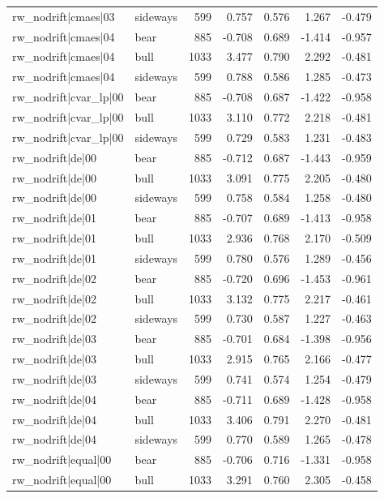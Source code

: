 \begin{table}
\begin{tabular}{llrrrrr}
rw\_nodrift|cmaes|03 & sideways & 599 & 0.757 & 0.576 & 1.267 & -0.479 \\
rw\_nodrift|cmaes|04 & bear & 885 & -0.708 & 0.689 & -1.414 & -0.957 \\
rw\_nodrift|cmaes|04 & bull & 1033 & 3.477 & 0.790 & 2.292 & -0.481 \\
rw\_nodrift|cmaes|04 & sideways & 599 & 0.788 & 0.586 & 1.285 & -0.473 \\
rw\_nodrift|cvar\_lp|00 & bear & 885 & -0.708 & 0.687 & -1.422 & -0.958 \\
rw\_nodrift|cvar\_lp|00 & bull & 1033 & 3.110 & 0.772 & 2.218 & -0.481 \\
rw\_nodrift|cvar\_lp|00 & sideways & 599 & 0.729 & 0.583 & 1.231 & -0.483 \\
rw\_nodrift|de|00 & bear & 885 & -0.712 & 0.687 & -1.443 & -0.959 \\
rw\_nodrift|de|00 & bull & 1033 & 3.091 & 0.775 & 2.205 & -0.480 \\
rw\_nodrift|de|00 & sideways & 599 & 0.758 & 0.584 & 1.258 & -0.480 \\
rw\_nodrift|de|01 & bear & 885 & -0.707 & 0.689 & -1.413 & -0.958 \\
rw\_nodrift|de|01 & bull & 1033 & 2.936 & 0.768 & 2.170 & -0.509 \\
rw\_nodrift|de|01 & sideways & 599 & 0.780 & 0.576 & 1.289 & -0.456 \\
rw\_nodrift|de|02 & bear & 885 & -0.720 & 0.696 & -1.453 & -0.961 \\
rw\_nodrift|de|02 & bull & 1033 & 3.132 & 0.775 & 2.217 & -0.461 \\
rw\_nodrift|de|02 & sideways & 599 & 0.730 & 0.587 & 1.227 & -0.463 \\
rw\_nodrift|de|03 & bear & 885 & -0.701 & 0.684 & -1.398 & -0.956 \\
rw\_nodrift|de|03 & bull & 1033 & 2.915 & 0.765 & 2.166 & -0.477 \\
rw\_nodrift|de|03 & sideways & 599 & 0.741 & 0.574 & 1.254 & -0.479 \\
rw\_nodrift|de|04 & bear & 885 & -0.711 & 0.689 & -1.428 & -0.958 \\
rw\_nodrift|de|04 & bull & 1033 & 3.406 & 0.791 & 2.270 & -0.481 \\
rw\_nodrift|de|04 & sideways & 599 & 0.770 & 0.589 & 1.265 & -0.478 \\
rw\_nodrift|equal|00 & bear & 885 & -0.706 & 0.716 & -1.331 & -0.958 \\
rw\_nodrift|equal|00 & bull & 1033 & 3.291 & 0.760 & 2.305 & -0.458 \\

\end{tabular}
\end{table}

